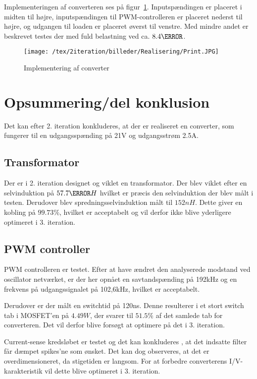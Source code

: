 Implementeringen af converteren ses på figur~\ref{fig:Mini_Mount}. Inputspændingen er placeret i midten til højre, inputspændingen til PWM-controlleren er placeret nederst til højre, og udgangen til loaden er placeret øverst til venstre. Med mindre andet er beskrevet testes der med fuld belastning ved ca. $8.4\ohm$.

\begin{figure}[H]
	\center
	\texttt{[image: /tex/2iteration/billeder/Realisering/Print.JPG]}
	\caption{Implementering af converter}
	\label{fig:Mini_Mount}
\end{figure}



\section{Opsummering/del konklusion}
Det kan efter 2. iteration konkluderes, at der er realiseret en converter, som fungerer til en udgangsspænding på 21V og udgangsstrøm 2.5A.

\subsection{Transformator}
Der er i 2. iteration designet og viklet en transformator. Der blev viklet efter en selvinduktion på $57.7\micro H$ hvilket er præcis den selvinduktion der blev målt i testen. Derudover blev spredningsselvinduktion målt til $152nH$. Dette giver en kobling på $99.73\percent$, hvilket er acceptabelt og vil derfor ikke blive yderligere optimeret i 3. iteration. 

\subsection{PWM controller} 
PWM controlleren er testet. Efter at have ændret den analyserede modstand ved oscillator netværket, er der her opnået en savtandspænding på 192kHz og en frekvens på udgangssignalet på 102,6kHz, hvilket er acceptabelt.

Derudover er der målt en switchtid på 120ns. Denne resulterer i et stort switch tab i MOSFET'en på $4.49W$, der svarer til $51.5\percent$ af det samlede tab for converteren.  Det vil derfor blive forsøgt at optimere på det i 3. iteration. 

Current-sense kredsløbet er testet og det kan konkluderes , at det indsatte filter får dæmpet spikes'ne som ønsket. Det kan dog observeres, at det er overdimensioneret, da stigetiden er langsom. For at forbedre converterens I/V-karakteristik vil dette blive optimeret i 3. iteration. 

